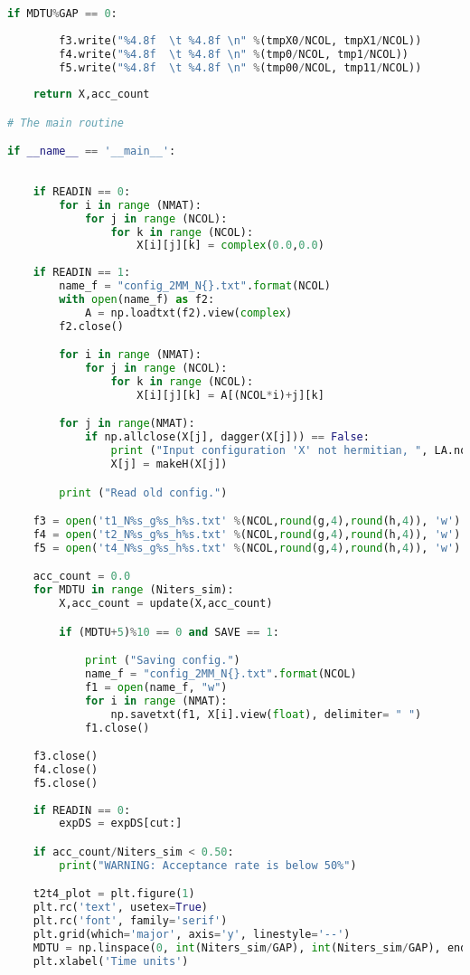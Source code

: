 \begin{footnotesize}
\begin{lstlisting}[language=Python]
    if MDTU%GAP == 0:
        
        f3.write("%4.8f  \t %4.8f \n" %(tmpX0/NCOL, tmpX1/NCOL))
        f4.write("%4.8f  \t %4.8f \n" %(tmp0/NCOL, tmp1/NCOL))
        f5.write("%4.8f  \t %4.8f \n" %(tmp00/NCOL, tmp11/NCOL))
        
    return X,acc_count 

# The main routine 

if __name__ == '__main__':
    
    
    if READIN == 0:
        for i in range (NMAT):
            for j in range (NCOL):
                for k in range (NCOL):
                    X[i][j][k] = complex(0.0,0.0)
                    
    if READIN == 1:
        name_f = "config_2MM_N{}.txt".format(NCOL)
        with open(name_f) as f2:
            A = np.loadtxt(f2).view(complex)
        f2.close()

        for i in range (NMAT):
            for j in range (NCOL):
                for k in range (NCOL):
                    X[i][j][k] = A[(NCOL*i)+j][k]

        for j in range(NMAT):
            if np.allclose(X[j], dagger(X[j])) == False:
                print ("Input configuration 'X' not hermitian, ", LA.norm(X[j] - dagger(X[j])), "making it so")
                X[j] = makeH(X[j])

        print ("Read old config.")

    f3 = open('t1_N%s_g%s_h%s.txt' %(NCOL,round(g,4),round(h,4)), 'w')
    f4 = open('t2_N%s_g%s_h%s.txt' %(NCOL,round(g,4),round(h,4)), 'w')
    f5 = open('t4_N%s_g%s_h%s.txt' %(NCOL,round(g,4),round(h,4)), 'w')

    acc_count = 0.0
    for MDTU in range (Niters_sim):
        X,acc_count = update(X,acc_count)

        if (MDTU+5)%10 == 0 and SAVE == 1:

            print ("Saving config.")
            name_f = "config_2MM_N{}.txt".format(NCOL)
            f1 = open(name_f, "w")
            for i in range (NMAT):
                np.savetxt(f1, X[i].view(float), delimiter= " ")  
            f1.close()

    f3.close()
    f4.close()
    f5.close()
   
    if READIN == 0:
        expDS = expDS[cut:] 

    if acc_count/Niters_sim < 0.50:
        print("WARNING: Acceptance rate is below 50%")

    t2t4_plot = plt.figure(1) 
    plt.rc('text', usetex=True)
    plt.rc('font', family='serif')
    plt.grid(which='major', axis='y', linestyle='--')
    MDTU = np.linspace(0, int(Niters_sim/GAP), int(Niters_sim/GAP), endpoint=True)
    plt.xlabel('Time units')


\end{lstlisting}
\end{footnotesize}
